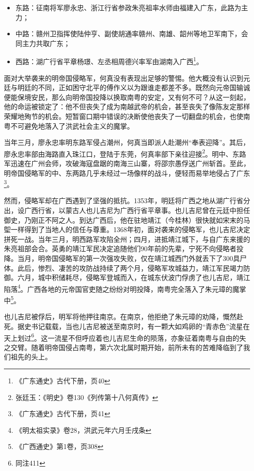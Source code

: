 \begin{itemize}
	\item 东路：征南将军廖永忠、浙江行省参政朱亮祖率水师由福建入广东，此路为主力；
	\item 中路：赣州卫指挥使陆仲亨、副使胡通率赣州、南雄、韶州等地卫军南下，会同主力共取广东；
	\item 西路：湖广行省平章杨璟、左丞相周德兴率军由湖南入广西\footnote{《广东通史》古代下册，页40}。
\end{itemize}

面对大举袭来的明帝国侵略军，何真没有表现出足够的警惕。他大概没有认识到元廷与明廷的不同，正如困守北平的傅作义以为跟谁走都差不多。既然向元帝国输诚便能保境安民，那么向明帝国投降以换取南粤的安定，又有何不可？从这一刻起，他的命运被锁定了：他不但丧失了成为南越武帝的机会，甚至丧失了像陈友定那样荣耀地殉节的机会。短暂窗口期中错误的决断使他丧失了一切翻盘的机会，也使南粤不可避免地落入了洪武社会主义的魔掌。

当年三月，廖永忠率明东路军侵占潮州，何真当即派人赴潮州“奉表迎降”。其后，廖永忠率部由海路直入珠江口，登陆于东莞，何真率部下亲往迎接\footnote{张廷玉：《明史》卷130《列传第十八何真传》}。明中、东路军迅速在广州会师，攻破海寇盘踞的南海三山寨，将邵宗愚俘送广州斩首。至此，明帝国侵略军的中、东两路几乎未经过一场像样的战斗，便轻而易举地侵占了广东\footnote{《广东通史》古代下册，页41}。

然而，侵略军却在广西遇到了坚强的抵抗。1353年，明廷将广西之地从湖广行省分出，设广西行省，以蒙古人也儿吉尼为广西行省平章事。也儿吉尼曾在元廷中担任御史，乃刚正不阿之人。到达广西后，他在驻地靖江（今桂林）很快就如宋末的马堲一样得到了当地人的信任与尊重。1368年初，面对袭来的侵略军，也儿吉尼决定拼死一战。当年三月，明西路军攻陷全州；四月，进抵靖江城下，与自广东来援的朱亮祖部会合。英勇的靖江军民决定追随他们90年前的先辈，宁死不向侵略者投降。当月，明帝国侵略军的第一次强攻失败，仅在靖江城西门外就丢下了300具尸体。此后，惨烈、凄苦的攻防战持续了两个月，侵略军攻城益力，靖江军民竭力防御。六月，城中积储耗尽，侵略军登城而入，在城东伏波门俘虏了也儿吉尼，靖江陷落\footnote{《明太祖实录》卷28，洪武元年六月壬戌条}。广西各地的元帝国官吏随之纷纷对明投降，南粤完全落入了朱元璋的魔掌中\footnote{《广西通史》第1卷，页308}。

也儿吉尼被俘后，明军将他押往南京。在南京，他拒绝了朱元璋的劝降，慨然赴死。据史书记载载，当也儿吉尼被送至南京时，有一颗大如鸡卵的“青赤色”流星在天上划过\footnote{同注411}。这一流星不但呼应着也儿吉尼生命的陨落，亦象征着南粤与自由的失之交臂。随着明帝国侵占南粤，第六次北属时期开始，前所未有的苦难降临到了我们祖先的头上。

